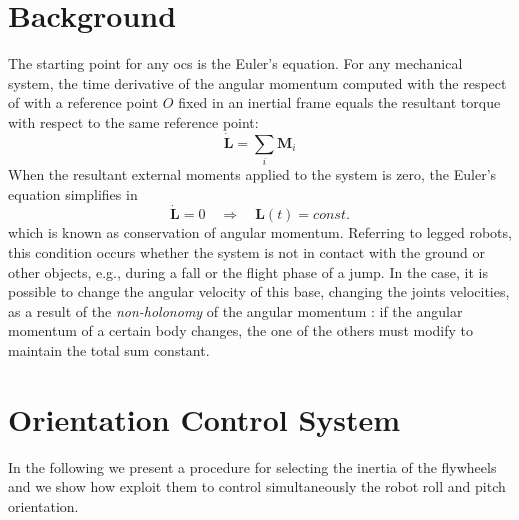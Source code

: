 \documentclass[letterpaper, 10 pt, conference]{ieeeconf}  %
\begin{document}
\section{Background}
The starting point for any \gls{ocs} is the Euler's equation. For any mechanical system, the time derivative of the angular momentum computed with the respect of with a reference point $O$ fixed in an inertial frame equals
the resultant torque with respect to the same reference point:
\begin{equation}
	\dot{\bm{L}} = \sum_i \bm{M}_i
\end{equation}
When the resultant external moments applied to the system is zero, the Euler’s equation simplifies in
\begin{equation}
\dot{\bm{L}} = 0 \quad \Rightarrow \quad \bm{L}(t) = const.
\label{eq:cons_ang_mom}
\end{equation}
which is known as conservation of angular momentum.
Referring to legged robots, this condition occurs whether the system is not in contact with the ground or other objects, e.g., during a fall or the flight phase of a jump.
In the case, it is possible to change the angular velocity of this base, changing the joints velocities, as a result of the \textit{non-holonomy} of the angular momentum \cite{Wieber16}: if the angular momentum of a certain body changes, the one of the others must modify to maintain the total sum constant.

\section{Orientation Control System}
In the following we present a procedure for selecting the inertia of the flywheels and we show how exploit them to control simultaneously the robot roll and pitch orientation.
\end{document}
